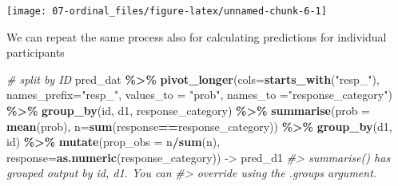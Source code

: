 \documentclass[
]{book}
\newenvironment{Shaded}{\begin{snugshade}}{\end{snugshade}}
\newcommand{\AttributeTok}[1]{\textcolor[rgb]{0.13,0.29,0.53}{#1}}
\newcommand{\CommentTok}[1]{\textcolor[rgb]{0.56,0.35,0.01}{\textit{#1}}}
\newcommand{\FunctionTok}[1]{\textcolor[rgb]{0.13,0.29,0.53}{\textbf{#1}}}
\newcommand{\NormalTok}[1]{#1}
\newcommand{\OtherTok}[1]{\textcolor[rgb]{0.56,0.35,0.01}{#1}}
\newcommand{\SpecialCharTok}[1]{\textcolor[rgb]{0.81,0.36,0.00}{\textbf{#1}}}
\newcommand{\StringTok}[1]{\textcolor[rgb]{0.31,0.60,0.02}{#1}}
\begin{document}
\begin{center}\texttt{[image: 07-ordinal\_files/figure-latex/unnamed-chunk-6-1]} \end{center}

We can repeat the same process also for calculating predictions for individual participants

\begin{Shaded}
\begin{Highlighting}[]
\CommentTok{\# split by ID}
\NormalTok{pred\_dat }\SpecialCharTok{\%\textgreater{}\%}
  \FunctionTok{pivot\_longer}\NormalTok{(}\AttributeTok{cols=}\FunctionTok{starts\_with}\NormalTok{(}\StringTok{"resp\_"}\NormalTok{), }
               \AttributeTok{names\_prefix=}\StringTok{"resp\_"}\NormalTok{,}
               \AttributeTok{values\_to =} \StringTok{"prob"}\NormalTok{,}
               \AttributeTok{names\_to =}\StringTok{"response\_category"}\NormalTok{) }\SpecialCharTok{\%\textgreater{}\%}
  \FunctionTok{group\_by}\NormalTok{(id, d1, response\_category) }\SpecialCharTok{\%\textgreater{}\%}
  \FunctionTok{summarise}\NormalTok{(}\AttributeTok{prob =} \FunctionTok{mean}\NormalTok{(prob),}
            \AttributeTok{n=}\FunctionTok{sum}\NormalTok{(response}\SpecialCharTok{==}\NormalTok{response\_category)) }\SpecialCharTok{\%\textgreater{}\%}
  \FunctionTok{group\_by}\NormalTok{(d1, id) }\SpecialCharTok{\%\textgreater{}\%}
  \FunctionTok{mutate}\NormalTok{(}\AttributeTok{prop\_obs =}\NormalTok{ n}\SpecialCharTok{/}\FunctionTok{sum}\NormalTok{(n),}
         \AttributeTok{response=}\FunctionTok{as.numeric}\NormalTok{(response\_category))  }\OtherTok{{-}\textgreater{}}\NormalTok{ pred\_d1}
\CommentTok{\#\textgreater{} \textasciigrave{}summarise()\textasciigrave{} has grouped output by \textquotesingle{}id\textquotesingle{}, \textquotesingle{}d1\textquotesingle{}. You can}
\CommentTok{\#\textgreater{} override using the \textasciigrave{}.groups\textasciigrave{} argument.}
\end{Highlighting}
\end{Shaded}
\end{document}
